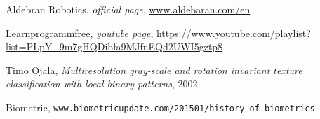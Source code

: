 \begin{thebibliography}{99999}
\singlespace\normalsize

 Aldebran Robotics, \textit{ official page}, \url{www.aldebaran.com/en}

 Learnprogrammfree, \textit{youtube page}, \url{https://www.youtube.com/playlist?list=PLpY_9m7gHQDibfa9MJfnEQd2UWI5gztp8}



 Timo Ojala, \textit{Multiresolution gray-scale and rotation invariant texture classification with local binary patterns}, 2002

 Biometric, \texttt{www.biometricupdate.com/201501/history-of-biometrics}


\end{thebibliography}
